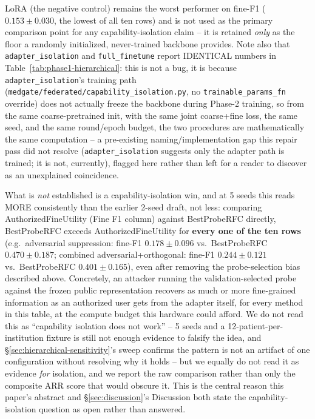 \documentclass[11pt]{article}
\begin{document}
LoRA (the negative control) remains the worst performer on fine-F1
($0.153\pm0.030$, the lowest of all ten rows) and is not used as the
primary comparison point for any capability-isolation claim -- it is
retained \emph{only} as the floor a randomly initialized, never-trained
backbone provides. Note also that \texttt{adapter\_isolation} and
\texttt{full\_finetune} report IDENTICAL numbers in
Table~\ref{tab:phase1-hierarchical}: this is not a bug, it is because
\texttt{adapter\_isolation}'s training path (\texttt{medgate/federated/capability\_isolation.py},
no \texttt{trainable\_params\_fn} override) does not actually freeze the
backbone during Phase-2 training, so from the same coarse-pretrained init,
with the same joint coarse+fine loss, the same seed, and the same
round/epoch budget, the two procedures are mathematically the same
computation -- a pre-existing naming/implementation gap this repair pass
did not resolve (\texttt{adapter\_isolation} suggests only the adapter path
is trained; it is not, currently), flagged here rather than left for a
reader to discover as an unexplained coincidence.

What is \emph{not} established is a capability-isolation win, and at 5
seeds this reads MORE consistently than the earlier 2-seed draft, not
less: comparing AuthorizedFineUtility (Fine F1 column) against
BestProbeRFC directly, BestProbeRFC exceeds AuthorizedFineUtility for
\textbf{every one of the ten rows} (e.g.\ adversarial suppression: fine-F1
$0.178\pm0.096$ vs.\ BestProbeRFC $0.470\pm0.187$; combined
adversarial+orthogonal: fine-F1 $0.244\pm0.121$ vs.\ BestProbeRFC
$0.401\pm0.165$), even after removing the probe-selection bias described
above. Concretely, an attacker running the validation-selected probe
against the frozen public representation recovers as much or more
fine-grained information as an authorized user gets from the adapter
itself, for every method in this table, at the compute budget this
hardware could afford. We do not read this as ``capability isolation does
not work'' -- 5 seeds and a 12-patient-per-institution fixture is still
not enough evidence to falsify the idea, and \S\ref{sec:hierarchical-sensitivity}'s
sweep confirms the pattern is not an artifact of one configuration without
resolving why it holds -- but we equally do not read it as evidence
\emph{for} isolation, and we report the raw comparison rather than only
the composite ARR score that would obscure it. This is the central reason
this paper's abstract and \S\ref{sec:discussion}'s Discussion both state
the capability-isolation question as open rather than answered.
\end{document}
